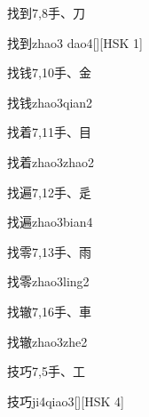 \begin{entry}{找到}{7,8}{⼿、⼑}
  \begin{phonetics}{找到}{zhao3 dao4}[][HSK 1]
  \end{phonetics}
\end{entry}

\begin{entry}{找钱}{7,10}{⼿、⾦}
  \begin{phonetics}{找钱}{zhao3qian2}
  \end{phonetics}
\end{entry}

\begin{entry}{找着}{7,11}{⼿、⽬}
  \begin{phonetics}{找着}{zhao3zhao2}
  \end{phonetics}
\end{entry}

\begin{entry}{找遍}{7,12}{⼿、⾡}
  \begin{phonetics}{找遍}{zhao3bian4}
  \end{phonetics}
\end{entry}

\begin{entry}{找零}{7,13}{⼿、⾬}
  \begin{phonetics}{找零}{zhao3ling2}
  \end{phonetics}
\end{entry}

\begin{entry}{找辙}{7,16}{⼿、⾞}
  \begin{phonetics}{找辙}{zhao3zhe2}
  \end{phonetics}
\end{entry}

\begin{entry}{技巧}{7,5}{⼿、⼯}
  \begin{phonetics}{技巧}{ji4qiao3}[][HSK 4]
  \end{phonetics}
\end{entry}

